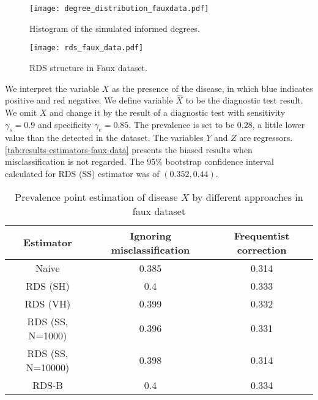 \begin{figure}[htbp]
    \centering
    \caption{\label{fig:degre_distribution_fauxdata}Histogram of the simulated 
    informed degrees.}
    \texttt{[image: degree\_distribution\_fauxdata.pdf]}
\end{figure}

\begin{figure}[htb]
    \centering
    \caption{\label{fig:rds_faux_data}RDS structure in 
      Faux dataset.}
    \texttt{[image: rds\_faux\_data.pdf]}
  \end{figure}

We interpret the variable $X$ as the presence of the disease, in
which blue indicates positive and red negative. We define variable $\hat{X}$
to be the diagnostic test result. We omit $X$ and change it by the result of a
diagnostic test with sensitivity $\gamma_s = 0.9$ and specificity $\gamma_e =
0.85$. The prevalence is set to be $0.28$, a little
lower value than the detected in the dataset. The variables $Y$ and $Z$ are
regressors. \autoref{tab:results-estimators-faux-data} presents the biased
results when misclassification is not regarded. The 95\% bootstrap confidence interval
calculated for RDS (SS) estimator was of $(0.352, 0.44)$. 

\begin{table}[htb]
    \centering
    \caption{\label{tab:results-estimators-faux-data}Prevalence point estimation of
    disease $X$ by different approaches in faux dataset}
    \begin{tabular}{ccc}
    \hline
    Estimator & Ignoring misclassification & Frequentist correction \\ \hline
    Naive & 0.385 & 0.314 \\
    RDS (SH) & 0.4 & 0.333 \\
    RDS (VH) & 0.399 & 0.332 \\
    RDS (SS, N=1000) & 0.396 & 0.331 \\
    RDS (SS, N=10000) & 0.398 & 0.314 \\
    RDS-B & 0.4 & 0.334 \\ \hline
    \end{tabular}
\end{table}

